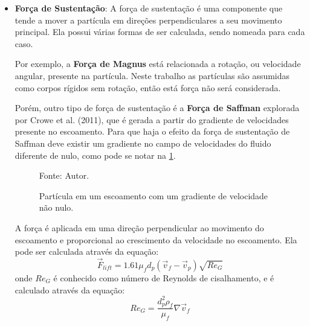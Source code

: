 \begin{itemize}
    \item \textbf{Força de Sustentação}:
        A força de sustentação é uma componente que tende a mover a partícula em direções perpendiculares a seu movimento principal.
        Ela possui várias formas de ser calculada, sendo nomeada para cada caso.

        Por exemplo, a \textbf{Força de Magnus} está relacionada a rotação, ou velocidade angular, presente na partícula.
        Neste trabalho as partículas são assumidas como corpos rígidos sem rotação, então está força não será considerada.

        Porém, outro tipo de força de sustentação é a \textbf{Força de Saffman} explorada por Crowe et al. (2011)\cite{crowe}, que é gerada a partir do gradiente de velocidades presente no escoamento.
        Para que haja o efeito da força de sustentação de Saffman deve existir um gradiente no campo de velocidades do fluido diferente de nulo, como pode se notar na \ref{saffman}.
        \begin{figure}[H]
            \centering
             {\raggedleft \scriptsize Fonte: Autor.}
            \caption{Partícula em um escoamento com um gradiente de velocidade não nulo.}
            \label{saffman}
        \end{figure}

        A força é aplicada em uma direção perpendicular ao movimento do escoamento e proporcional ao crescimento da velocidade no escoamento.
        Ela pode ser calculada através da equação:
        \begin{equation}
            \vec{F}_{lift} = 1.61 \mu_f d_p \left(\vec{v}_{f} - \vec{v}_{p} \right) \sqrt{{Re}_G}
            \label{lift}
        \end{equation}
        onde $Re_{G}$ é conhecido como número de Reynolds de cisalhamento, e é calculado através da equação:
        \begin{equation}
            Re_G = \dfrac{d_p^2 \rho_f}{\mu_f} \nabla \vec{v}_f
            \label{reg}
        \end{equation}


\end{itemize}
